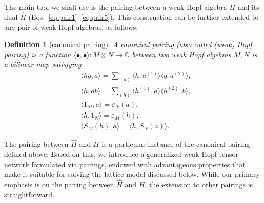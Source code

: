 \documentclass[a4paper,11pt]{article}
\theoremstyle{theorem}
\newtheorem{definition}{Definition}
\theoremstyle{remark}
\begin{document}
The main tool we shall use is the pairing between a weak Hopf algebra $H$ and its dual $\hat{H}$ (Eqs.~\eqref{eq:pair1}--\eqref{eq:pair5}). This construction can be further extended to any pair of weak Hopf algebras, as follows:

\begin{definition}[canonical pairing]
\label{def:pairingDef}
     A canonical pairing (also called (weak) Hopf pairing) is a function $\langle \bullet, \bullet \rangle: M\otimes N\to \mathbb{C}$ between two weak Hopf algebras $M,N$ is a bilinear map satisfying
     \begin{align}
       &  \langle hg,a\rangle = \sum_{(a)} \langle h,a^{(1)}\rangle \langle g,a^{(2)}\rangle,\\
    &     \langle h,ab\rangle =\sum_{(h)} \langle h^{(1)} ,a\rangle \langle h^{(2)},b\rangle,\\
     &    \langle 1_M,a\rangle =\varepsilon_N(a),\\
       &  \langle h,1_N\rangle =\varepsilon_M(h),\\
        & \langle S_M(h),a\rangle = \langle h, S_N(a)\rangle.
     \end{align}
\end{definition}

The pairing between $\hat{H}$ and $H$ is a particular instance of the canonical pairing defined above. Based on this, we introduce a generalized weak Hopf tensor network formulated via pairings, endowed with advantageous properties that make it suitable for solving the lattice model discussed below. 
While our primary emphasis is on the pairing between $\hat{H}$ and $H$, the extension to other pairings is straightforward.
\end{document}
